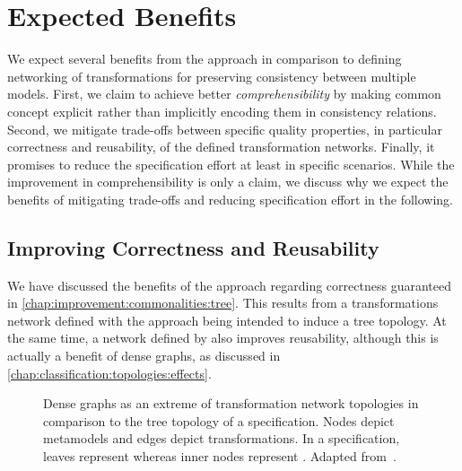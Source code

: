 \section{Expected Benefits}
\label{chap:improvement:benefits}

We expect several benefits from the \commonalities approach in comparison to defining networking of transformations for preserving consistency between multiple models.
First, we claim to achieve better \emph{comprehensibility} by making common concept explicit rather than implicitly encoding them in consistency relations.
Second, we mitigate trade-offs between specific quality properties, in particular correctness and reusability, of the defined transformation networks.
Finally, it promises to reduce the specification effort at least in specific scenarios.
While the improvement in comprehensibility is only a claim, we discuss why we expect the benefits of mitigating trade-offs and reducing specification effort in the following.


\subsection{Improving Correctness and Reusability}
\label{chap:improvement:benefits:properties}

We have discussed the benefits of the \commonalities approach regarding correctness guaranteed in \autoref{chap:improvement:commonalities:tree}.
This results from a transformations network defined with the \commonalities approach being intended to induce a tree topology.
At the same time, a network defined by \commonalities also improves reusability, although this is actually a benefit of dense graphs, as discussed in \autoref{chap:classification:topologies:effects}.

\begin{figure}
    \centering
    \begin{minipage}[b]{0.49\columnwidth}
        \centering
        
        \label{fig:improvement:topologies:full}
    \end{minipage}
    \hfill
    \begin{minipage}[b]{0.49\columnwidth}
        \centering
        
        \vspace{1em}
        \label{fig:improvement:topologies:tree}
    \end{minipage}
    \caption[Benefit of \commonalities regarding quality trade-offs]{Dense graphs as an extreme of transformation network topologies in comparison to the tree topology of a \commonalities specification. Nodes depict metamodels and edges depict transformations. In a \commonalities specification, leaves represent \concretemetamodels whereas inner nodes represent \conceptmetamodels. Adapted from~.}
    \label{fig:improvement:topologies}
\end{figure}

